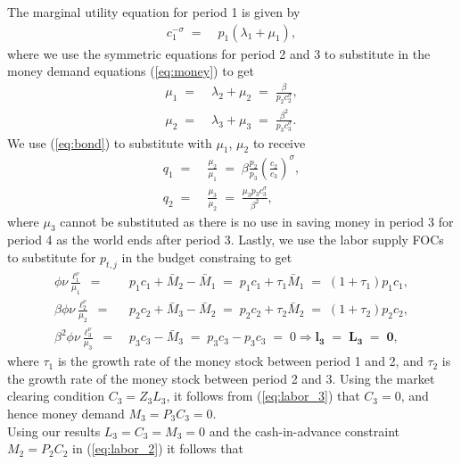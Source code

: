 \documentclass[a4paper, 12pt]{article}
\begin{document}
\begin{Answer}%
	The marginal utility equation for period 1 is given by%
	\begin{align}%
		c_1^{-\sigma} \; = & \; p_1 \left( \lambda_1 + \mu_1 \right),%
	\end{align}%
	where we use the symmetric equations for period 2 and 3 to substitute in the money demand equations (\ref{eq:money}) to get%
	\begin{align}%
		\mu_1 \; = & \; \lambda_2 + \mu_2 \; = \; \frac{\beta}{p_2 c_2^\sigma},\label{eq:mu_1}\\%
		\mu_2 \; = & \; \lambda_3 + \mu_3 \; = \; \frac{\beta^2}{p_3 c_3^\sigma}.%
	\end{align}%
	We use (\ref{eq:bond}) to substitute with $\mu_1$, $\mu_2$ to receive%
	\begin{align}%
		q_1 \; = & \; \frac{\mu_2}{\mu_1} \; = \; \beta \frac{p_2}{p_3} \left(\frac{c_2}{c_3}\right)^\sigma,\label{eq:bond_1}\\%
		q_2 \; = & \; \frac{\mu_3}{\mu_2} \; = \; \frac{\mu_3 p_3 c_3^\sigma}{\beta^2},\label{eq:bond_2}%
	\end{align}%
	where $\mu_3$ cannot be substituted as there is no use in saving money in period 3 for period 4 as the world ends after period 3. Lastly, we use the labor supply FOCs to substitute for $p_{t,j}$ in the budget constraing to get%
	\begin{align}%
		\phi \nu \frac{\ell_1^\nu}{\mu_1} \; = & \; p_1 c_1 + \bar{M}_2 - \bar{M}_1 \; = \; p_1 c_1 + \tau_1 \bar{M}_1 \; = \; \left(1+\tau_1\right) p_1 c_1,\label{eq:labor_1}\\%
		\beta \phi \nu \frac{\ell_2^\nu}{\mu_2} \; = & \; p_2 c_2 + \bar{M}_3 - \bar{M}_2 \; = \; p_2 c_2 + \tau_2 \bar{M}_2 \; = \; \left(1+\tau_2\right) p_2 c_2,\label{eq:labor_2}\\%
		\beta^2 \phi \nu \frac{\ell_3^\nu}{\mu_3} \; = & \; p_3 c_3 - \bar{M}_3 \; = \; p_3 c_3 - p_3 c_3 \; = \; 0 \boldsymbol{\Rightarrow l_3 \; = \; L_3 \; = \; 0},\label{eq:labor_3}%
	\end{align}%
	where $\tau_1$ is the growth rate of the money stock between period 1 and 2, and $\tau_2$ is the growth rate of the money stock between period 2 and 3. Using the market clearing condition $C_3 = Z_3 L_3$, it follows from (\ref{eq:labor_3}) that $C_3 = 0$, and hence money demand $M_3 = P_3 C_3 = 0$.\\%
	Using our results $L_3 = C_3 = M_3 = 0$ and the cash-in-advance constraint $M_2 = P_2 C_2$ in (\ref{eq:labor_2}) it follows that%

\end{Answer}
\end{document}
